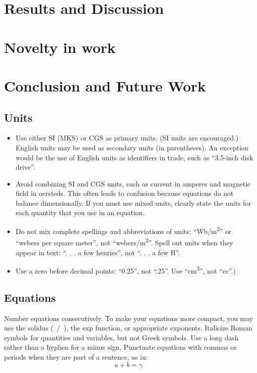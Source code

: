 \documentclass[conference]{IEEEtran}
\begin{document}
\section{Results and Discussion}

\section{Novelty in work}

\section{Conclusion and Future Work}


\subsection{Units}
\begin{itemize}
\item Use either SI (MKS) or CGS as primary units. (SI units are encouraged.) English units may be used as secondary units (in parentheses). An exception would be the use of English units as identifiers in trade, such as ``3.5-inch disk drive''.
\item Avoid combining SI and CGS units, such as current in amperes and magnetic field in oersteds. This often leads to confusion because equations do not balance dimensionally. If you must use mixed units, clearly state the units for each quantity that you use in an equation.
\item Do not mix complete spellings and abbreviations of units: ``Wb/m\textsuperscript{2}'' or ``webers per square meter'', not ``webers/m\textsuperscript{2}''. Spell out units when they appear in text: ``. . . a few henries'', not ``. . . a few H''.
\item Use a zero before decimal points: ``0.25'', not ``.25''. Use ``cm\textsuperscript{3}'', not ``cc''.)
\end{itemize}

\subsection{Equations}
Number equations consecutively. To make your 
equations more compact, you may use the solidus (~/~), the exp function, or 
appropriate exponents. Italicize Roman symbols for quantities and variables, 
but not Greek symbols. Use a long dash rather than a hyphen for a minus 
sign. Punctuate equations with commas or periods when they are part of a 
sentence, as in:
\begin{equation}
a+b=\gamma\label{eq}
\end{equation}
\end{document}
